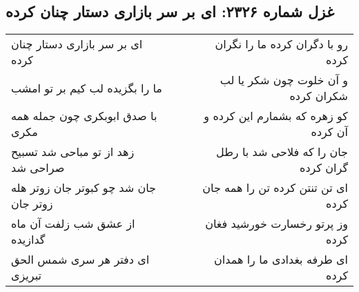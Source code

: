 \begin{center}
\section*{غزل شماره ۲۳۲۶: ای بر سر بازاری دستار چنان کرده}
\label{sec:2326}
\begin{longtable}{l p{0.5cm} r}
ای بر سر بازاری دستار چنان کرده
&&
رو با دگران کرده ما را نگران کرده
\\
ما را بگزیده لب کیم بر تو امشب
&&
و آن خلوت چون شکر یا لب شکران کرده
\\
با صدق ابوبکری چون جمله همه مکری
&&
کو زهره که بشمارم این کرده و آن کرده
\\
زهد از تو مباحی شد تسبیح صراحی شد
&&
جان را که فلاحی شد با رطل گران کرده
\\
جان شد چو کبوتر جان زوتر هله زوتر جان
&&
ای تن تنتن کرده تن را همه جان کرده
\\
از عشق شب زلفت آن ماه گدازیده
&&
وز پرتو رخسارت خورشید فغان کرده
\\
ای دفتر هر سری شمس الحق تبریزی
&&
ای طرفه بغدادی ما را همدان کرده
\\
\end{longtable}
\end{center}
